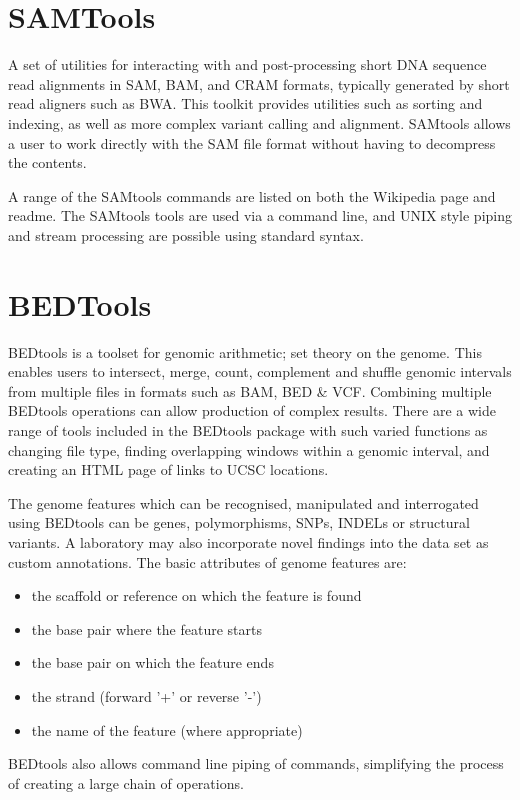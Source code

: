 \documentclass[12pt]{report}
\begin{document}
\section*{SAMTools}
A set of utilities for interacting with and post-processing short DNA sequence read alignments in SAM, BAM, and CRAM formats, typically generated by short read aligners such as BWA. This toolkit provides utilities such as sorting and indexing, as well as more complex variant calling and alignment. SAMtools allows a user to work directly with the SAM file format without having to decompress the contents. 

A range of the SAMtools commands are listed on both the Wikipedia page and readme. The SAMtools tools are used via a command line, and UNIX style piping and stream processing are possible using standard syntax.

\section*{BEDTools}
BEDtools is a toolset for genomic arithmetic; set theory on the genome. This enables users to intersect, merge, count, complement and shuffle genomic intervals from multiple files in formats such as BAM, BED \& VCF. Combining multiple BEDtools operations can allow production of complex results. There are a wide range of tools included in the BEDtools package with such varied functions as changing file type, finding overlapping windows within a genomic interval, and creating an HTML page of links to UCSC locations.

The genome features which can be recognised, manipulated and interrogated using BEDtools can be genes, polymorphisms, SNPs, INDELs or structural variants. A laboratory may also incorporate novel findings into the data set as custom annotations. The basic attributes of genome features are:
\begin{itemize}
	\item the scaffold or reference on which the feature is found
	\item the base pair where the feature starts
	\item the base pair on which the feature ends
	\item the strand (forward '+' or reverse '-')
	\item the name of the feature (where appropriate)
\end{itemize}

BEDtools also allows command line piping of commands, simplifying the process of creating a large chain of operations. 
\end{document}
